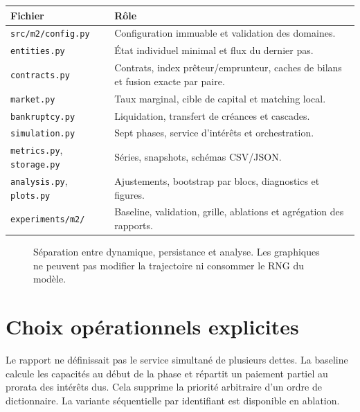 \documentclass[11pt,a4paper]{article}
\begin{document}
\begin{longtable}{p{}p{}}
\toprule
Fichier & Rôle \\
\midrule
\endhead
\texttt{src/m2/config.py} & Configuration immuable et validation des domaines. \\
\texttt{entities.py} & État individuel minimal et flux du dernier pas. \\
\texttt{contracts.py} & Contrats, index prêteur/emprunteur, caches de bilans et
fusion exacte par paire. \\
\texttt{market.py} & Taux marginal, cible de capital et matching local. \\
\texttt{bankruptcy.py} & Liquidation, transfert de créances et cascades. \\
\texttt{simulation.py} & Sept phases, service d'intérêts et orchestration. \\
\texttt{metrics.py}, \texttt{storage.py} & Séries, snapshots, schémas CSV/JSON. \\
\texttt{analysis.py}, \texttt{plots.py} & Ajustements, bootstrap par blocs,
diagnostics et figures. \\
\texttt{experiments/m2/} & Baseline, validation, grille, ablations et agrégation
des rapports. \\
\bottomrule
\end{longtable}

\begin{figure}[ht]
\centering
{}
\caption{Séparation entre dynamique, persistance et analyse. Les graphiques ne
peuvent pas modifier la trajectoire ni consommer le RNG du modèle.}
\end{figure}

\section{Choix opérationnels explicites}

Le rapport ne définissait pas le service simultané de plusieurs dettes. La
baseline calcule les capacités au début de la phase et répartit un paiement
partiel au prorata des intérêts dus. Cela supprime la priorité arbitraire d'un
ordre de dictionnaire. La variante séquentielle par identifiant est disponible
en ablation.
\end{document}
